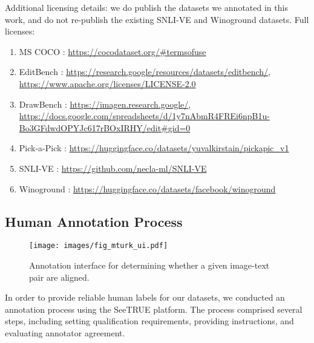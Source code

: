 \documentclass{article}
\newcommand{\datasetname}[0]{SeeTRUE\xspace}
\begin{document}
Additional licensing details: we do publish the datasets we annotated in this work, and do not re-publish the existing SNLI-VE and Winoground datasets. Full licenses: 
\begin{enumerate}
    \item MS COCO \cite{lin2014microsoft}: \url{https://cocodataset.org/#termsofuse}
    \item EditBench \cite{wang2022imagen}: \url{https://research.google/resources/datasets/editbench/}, \url{https://www.apache.org/licenses/LICENSE-2.0}
    \item DrawBench \cite{saharia2022photorealistic}: \url{https://imagen.research.google/}, \url{https://docs.google.com/spreadsheets/d/1y7nAbmR4FREi6npB1u-Bo3GFdwdOPYJc617rBOxIRHY/edit#gid=0}
    \item Pick-a-Pick \cite{kirstain2023pickapic}: \url{https://huggingface.co/datasets/yuvalkirstain/pickapic_v1}
    \item SNLI-VE \cite{xie2019visual}: \url{https://github.com/necla-ml/SNLI-VE}
    \item Winoground \cite{thrush2022winoground}: \url{https://huggingface.co/datasets/facebook/winoground}

\end{enumerate}

\begin{table}[!h]
\caption{\datasetname Rows Examples}
\label{tab:seetrue_example}
\end{table}

\subsection{Human Annotation Process}
\label{sec:human_annotation_appendix}
\begin{figure}[!htb]
    \centering
    \texttt{[image: images/fig\_mturk\_ui.pdf]}\\
    \caption{Annotation interface for determining whether a given image-text pair are aligned.}
    \label{fig:mturk_ui}
\end{figure} 
In order to provide reliable human labels for our datasets, we conducted an annotation process using the \datasetname platform. The process comprised several steps, including setting qualification requirements, providing instructions, and evaluating annotator agreement.
\end{document}
